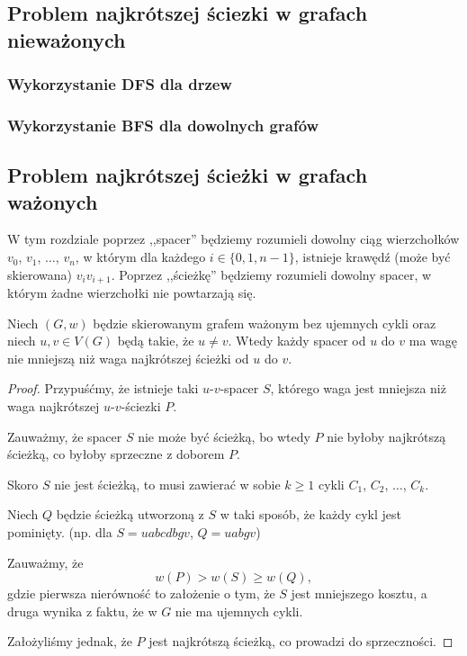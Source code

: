\subsection{Problem najkrótszej ściezki w grafach nieważonych}
\subsubsection{Wykorzystanie DFS dla drzew}
\subsubsection{Wykorzystanie BFS dla dowolnych grafów}

\subsection{Problem najkrótszej ścieżki w grafach ważonych}

W tym rozdziale poprzez ,,spacer'' będziemy rozumieli dowolny
ciąg wierzchołków $v_0$, $v_1$, $\dots$, $v_{n}$, w 
którym dla każdego $i \in \{0, 1, n-1\}$,
istnieje krawędź (może być skierowana)
$v_iv_{i+1}$. Poprzez ,,ścieżkę''
będziemy rozumieli dowolny spacer, w którym
żadne wierzchołki nie powtarzają się.

\begin{lemma}
	Niech $(G,w)$ będzie skierowanym grafem ważonym 
	bez ujemnych cykli oraz niech $u,v \in V(G)$ będą
	takie, że $u \neq v$. Wtedy
	każdy spacer od $u$ do $v$ ma wagę nie 
	mniejszą niż waga
	najkrótszej ścieżki od $u$ do $v$.
	\begin{proof}
		Przypuśćmy, że istnieje taki $u$-$v$-spacer $S$, 
		którego waga jest mniejsza niż waga najkrótszej
		$u$-$v$-ściezki $P$. 
		
		Zauważmy, że spacer $S$ nie może być ścieżką, 
		bo wtedy $P$ nie byłoby najkrótszą ścieżką, co 
		byłoby sprzeczne z doborem $P$.
		
		Skoro $S$ nie jest ścieżką, to musi zawierać
		w sobie $k\geq 1$ cykli $C_1$, $C_2$, $\dots$, $C_k$. 
		
		Niech $Q$ będzie ścieżką utworzoną z $S$ w taki sposób,
		że każdy cykl jest pominięty. (np. dla $S=uabcdbgv$, 
		$Q=uabgv$)
		
		Zauważmy, że
		\[w(P) > w(S) \geq w(Q),\]
		gdzie pierwsza nierówność to założenie o
		tym, że $S$ jest mniejszego kosztu, a druga wynika
		z faktu, że w $G$ nie ma ujemnych cykli.
		
		Założyliśmy jednak, że $P$ jest najkrótszą ścieżką,
		co prowadzi do sprzeczności. \qedhere
		
	\end{proof}
	\label{minpath_walk}
\end{lemma}

